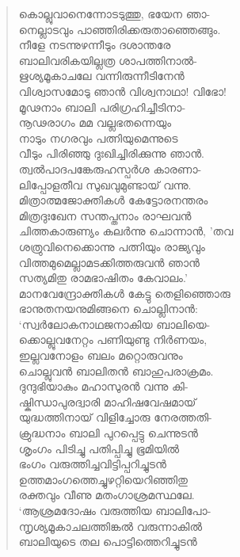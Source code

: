 \begin{verse}
കൊല്ലുവാനെന്നോടടുത്തു, ഭയേന ഞാ-\\
നെല്ലാടവും പാഞ്ഞിരിക്കരുതാഞ്ഞെങ്ങും.\\
നീളേ നടന്നുഴന്നീടും ദശാന്തരേ\\
ബാലിവരികയില്ലത്ര ശാപത്തിനാല്‍-\\
ഋശ്യമൂകാചലേ വന്നിരുന്നീടിനേന്‍\\
വിശ്വാസമോടു ഞാന്‍ വിശ്വനാഥാ! വിഭോ!\\
മൂഢനാം ബാലി പരിഗ്രഹിച്ചീടിനാ-\\
നൂഢരാഗം മമ വല്ലഭതന്നെയും\\
നാടും നഗരവും പത്നിയുമെന്നുടെ\\
വീടും പിരിഞ്ഞു ദുഃഖിച്ചിരിക്കുന്നു ഞാന്‍.\\
ത്വല്‍പാദപങ്കേരുഹസ്പര്‍ശ കാരണാ-\\
ലിപ്പോളതീവ സുഖവുമുണ്ടായ് വന്നു.\\
മിത്രാത്മജോക്തികള്‍ കേട്ടോരനന്തരം\\
മിത്രദുഃഖേന സന്തപ്തനാം രാഘവന്‍\\
ചിത്തകാരുണ്യം കലര്‍ന്നു ചൊന്നാന്‍, ’തവ\\
ശത്രുവിനെക്കൊന്നു പത്നിയും രാജ്യവും\\
വിത്തമുമെല്ലാമടക്കിത്തരുവന്‍ ഞാന്‍\\
സത്യമിതു രാമഭാഷിതം കേവാലം.’\\
മാനവേന്ദ്രോക്തികള്‍ കേട്ടു തെളിഞ്ഞൊരു\\
ഭാനുതനയനുമിങ്ങനെ ചൊല്ലിനാന്‍:\\
‘സ്വര്‍ലോകനാഥജനാകിയ ബാലിയെ-\\
ക്കൊല്ലുവനേറ്റം പണിയുണ്ടു നിര്‍ണയം,\\
ഇല്ലവനോളം ബലം മറ്റൊരുവനും\\
ചൊല്ലുവന്‍ ബാലിതന്‍ ബാഹുപരാക്രമം.\\
ദുന്ദുഭിയാകും മഹാസുരന്‍ വന്നു കി-\\
ഷ്കിന്ധാപുരദ്വാരി മാഹിഷവേഷമായ്\\
യുദ്ധത്തിനായ് വിളിച്ചോരു നേരത്തതി-\\
ക്രുദ്ധനാം ബാലി പുറപ്പെട്ടു ചെന്നുടന്‍\\
ശൃംഗം പിടിച്ചു പതിപ്പിച്ചു ഭൂമിയില്‍\\
ഭംഗം വരുത്തിച്ചവിട്ടിപ്പറിച്ചുടന്‍\\
ഉത്തമാംഗത്തെച്ചുഴറ്റിയെറിഞ്ഞിതു\\
രക്തവും വീണു മതംഗാശ്രമസ്ഥലേ.\\
‘ആശ്രമദോഷം വരുത്തിയ ബാലിപോ-\\
ന്നൃശ്യമൂകാചലത്തിങ്കല്‍ വരുന്നാകില്‍\\
ബാലിയുടെ തല പൊട്ടിത്തെറിച്ചുടന്‍\\

\end{verse}
